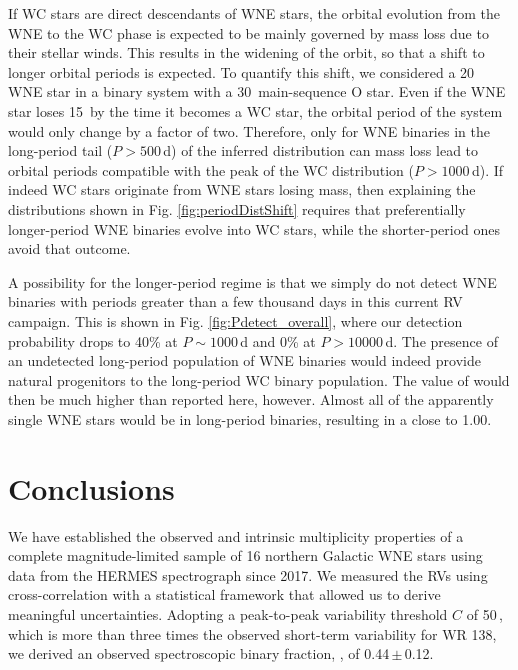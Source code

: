 If WC stars are direct descendants of WNE stars, the orbital evolution from the WNE to the WC phase is expected to be mainly governed by mass loss due to their stellar winds. This results in the widening of the orbit, so that a shift to longer orbital periods is expected. To quantify this shift, we considered a 20\,\Msun{} WNE star in a binary system with a 30\,\Msun{} main-sequence O star. Even if the WNE star loses 15\,\Msun{} by the time it becomes a WC star, the orbital period of the system would only change by a factor of two. Therefore, only for WNE binaries in the long-period tail ($P>500$\,d) of the inferred distribution can mass loss lead to orbital periods compatible with the peak of the WC distribution ($P>1000$\,d). If indeed WC stars originate from WNE stars losing mass, then explaining the distributions shown in Fig. \ref{fig:periodDistShift} requires that preferentially longer-period WNE binaries evolve into WC stars, while the shorter-period ones avoid that outcome. 

A possibility for the longer-period regime is that we simply do not detect WNE binaries with periods greater than a few thousand days in this current RV campaign. This is shown in Fig. \ref{fig:Pdetect_overall}, where our detection probability drops to 40\% at $P\sim1000$\,d and 0\% at $P>10000$\,d. The presence of an undetected long-period population of WNE binaries would indeed provide natural progenitors to the long-period WC binary population. The value of \fintWNE{} would then be much higher than reported here, however. Almost all of the apparently single WNE stars would be in long-period binaries, resulting in a \fintWNE{} close to 1.00. 

\section{Conclusions}\label{sect:conclusions_WNE}
We have established the observed and intrinsic multiplicity properties of a complete magnitude-limited sample of 16 northern Galactic WNE stars using data from the HERMES spectrograph since 2017. We measured the RVs using cross-correlation with a statistical framework that allowed us to derive meaningful uncertainties. Adopting a peak-to-peak variability threshold $C$ of 50\,\kms{}, which is more than three times the observed short-term variability for WR 138, we derived an observed spectroscopic binary fraction, \fobsWNE{}, of 0.44\,$\pm$\,0.12.


